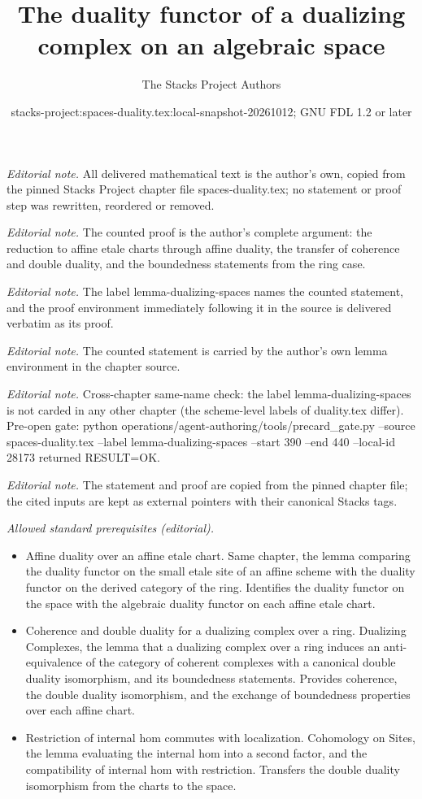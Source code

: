 \documentclass[10pt,a4paper]{amsart}
\title{The duality functor of a dualizing complex on an algebraic space}
\author{The Stacks Project Authors}
\date{stacks-project:spaces-duality.tex:local-snapshot-20261012; GNU FDL 1.2 or later}
\theoremstyle{plain}
\theoremstyle{definition}
\theoremstyle{remark}
\numberwithin{equation}{subsection}
\begin{document}
\maketitle
\noindent\textit{Editorial note.} All delivered mathematical text is the author's own, copied from the pinned Stacks Project chapter file spaces-duality.tex; no statement or proof step was rewritten, reordered or removed.\par\medskip
\noindent\textit{Editorial note.} The counted proof is the author's complete argument: the reduction to affine etale charts through affine duality, the transfer of coherence and double duality, and the boundedness statements from the ring case.\par\medskip
\noindent\textit{Editorial note.} The label lemma-dualizing-spaces names the counted statement, and the proof environment immediately following it in the source is delivered verbatim as its proof.\par\medskip
\noindent\textit{Editorial note.} The counted statement is carried by the author's own lemma environment in the chapter source.\par\medskip
\noindent\textit{Editorial note.} Cross-chapter same-name check: the label lemma-dualizing-spaces is not carded in any other chapter (the scheme-level labels of duality.tex differ). Pre-open gate: python operations/agent-authoring/tools/precard\_gate.py --source spaces-duality.tex --label lemma-dualizing-spaces --start 390 --end 440 --local-id 28173 returned RESULT=OK.\par\medskip
\noindent\textit{Editorial note.} The statement and proof are copied from the pinned chapter file; the cited inputs are kept as external pointers with their canonical Stacks tags.\par\medskip
\noindent\textit{Allowed standard prerequisites (editorial).}\begin{itemize}
\item Affine duality over an affine etale chart. Same chapter, the lemma comparing the duality functor on the small etale site of an affine scheme with the duality functor on the derived category of the ring. Identifies the duality functor on the space with the algebraic duality functor on each affine etale chart.
\item Coherence and double duality for a dualizing complex over a ring. Dualizing Complexes, the lemma that a dualizing complex over a ring induces an anti-equivalence of the category of coherent complexes with a canonical double duality isomorphism, and its boundedness statements. Provides coherence, the double duality isomorphism, and the exchange of boundedness properties over each affine chart.
\item Restriction of internal hom commutes with localization. Cohomology on Sites, the lemma evaluating the internal hom into a second factor, and the compatibility of internal hom with restriction. Transfers the double duality isomorphism from the charts to the space.
\end{itemize}\medskip
\end{document}
